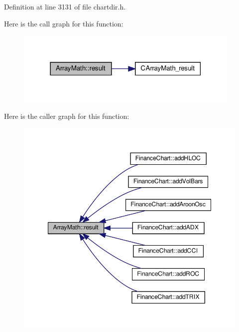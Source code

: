Definition at line 3131 of file chartdir.\+h.

Here is the call graph for this function\+:
\nopagebreak
\begin{figure}[H]
\begin{center}
\leavevmode
\includegraphics[width=306pt]{class_array_math_a2c81268f37eb5e4ab9c1c8e18bb22fa3_cgraph}
\end{center}
\end{figure}
Here is the caller graph for this function\+:
\nopagebreak
\begin{figure}[H]
\begin{center}
\leavevmode
\includegraphics[width=348pt]{class_array_math_a2c81268f37eb5e4ab9c1c8e18bb22fa3_icgraph}
\end{center}
\end{figure}
\mbox{\label{class_array_math_a7c219ae5049b2a515025f24ae5428a83}} 
